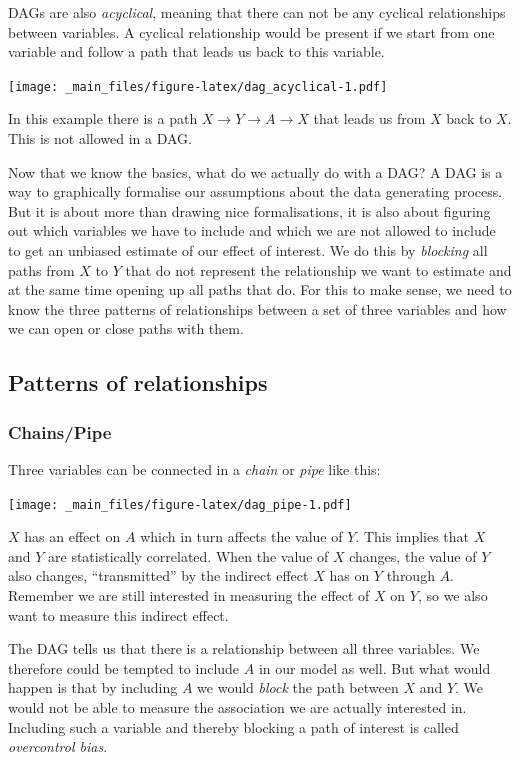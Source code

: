 \documentclass[
]{book}
\begin{document}
DAGs are also \emph{acyclical}, meaning that there can not be any cyclical
relationships between variables. A cyclical relationship would be
present if we start from one variable and follow a path that leads us
back to this variable.

\texttt{[image: \_main\_files/figure-latex/dag\_acyclical-1.pdf]}

In this example there is a path
\(X \rightarrow Y \rightarrow A \rightarrow X\) that leads us from \(X\)
back to \(X\). This is not allowed in a DAG.

Now that we know the basics, what do we actually do with a DAG? A DAG is
a way to graphically formalise our assumptions about the data generating
process. But it is about more than drawing nice formalisations, it is
also about figuring out which variables we have to include and which we
are not allowed to include to get an unbiased estimate of our effect of
interest. We do this by \emph{blocking} all paths from \(X\) to \(Y\) that do not
represent the relationship we want to estimate and at the same time
opening up all paths that do. For this to make sense, we need to know
the three patterns of relationships between a set of three variables and
how we can open or close paths with them.

\hypertarget{patterns-of-relationships}{%
\subsection{Patterns of relationships}\label{patterns-of-relationships}}

\hypertarget{chainspipe}{%
\subsubsection{Chains/Pipe}\label{chainspipe}}

Three variables can be connected in a \emph{chain} or \emph{pipe} like this:

\texttt{[image: \_main\_files/figure-latex/dag\_pipe-1.pdf]}

\(X\) has an effect on \(A\) which in turn affects the value of \(Y\). This
implies that \(X\) and \(Y\) are statistically correlated. When the value of
\(X\) changes, the value of \(Y\) also changes, ``transmitted'' by the
indirect effect \(X\) has on \(Y\) through \(A\). Remember we are still
interested in measuring the effect of \(X\) on \(Y\), so we also want to
measure this indirect effect.

The DAG tells us that there is a relationship between all three
variables. We therefore could be tempted to include \(A\) in our model as
well. But what would happen is that by including \(A\) we would \emph{block}
the path between \(X\) and \(Y\). We would not be able to measure the
association we are actually interested in. Including such a variable and
thereby blocking a path of interest is called \emph{overcontrol bias}.
\end{document}
